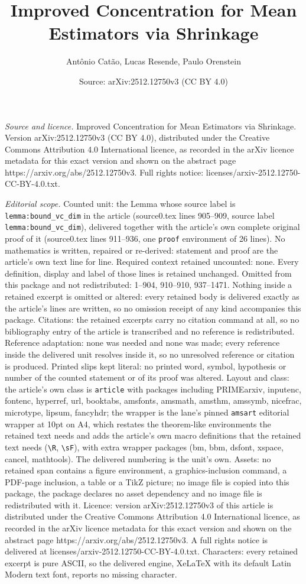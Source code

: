 \documentclass[10pt,a4paper]{amsart}
\title[Improved Concentration for Mean Estimators via Shrinkage]{Improved Concentration for Mean Estimators via Shrinkage}
\author{Ant\^onio Cat\~ao, Lucas Resende, Paulo Orenstein}
\date{Source: arXiv:2512.12750v3 (CC BY 4.0)}
\begin{document}
\maketitle

\noindent\emph{Source and licence.} Improved Concentration for Mean Estimators via Shrinkage. Version arXiv:2512.12750v3 (CC BY 4.0), distributed under the Creative Commons Attribution 4.0 International licence, as recorded in the arXiv licence metadata for this exact version and shown on the abstract page https://arxiv.org/abs/2512.12750v3. Full rights notice: licenses/arxiv-2512.12750-CC-BY-4.0.txt.\par\smallskip

\noindent\textit{Editorial scope.} Counted unit: the Lemma whose source label is \texttt{lemma:bound\_vc\_dim} in the article (source0.tex lines 905--909, source label \texttt{lemma:bound\_vc\_dim}), delivered together with the article's own complete original proof of it (source0.tex lines 911--936, one \texttt{proof} environment of 26 lines). No mathematics is written, repaired or re-derived: statement and proof are the article's own text line for line. Required context retained uncounted: none. Every definition, display and label of those lines is retained unchanged. Omitted from this package and not redistributed: 1--904, 910--910, 937--1471. Nothing inside a retained excerpt is omitted or altered: every retained body is delivered exactly as the article's lines are written, so no omission receipt of any kind accompanies this package. Citations: the retained excerpts carry no citation command at all, so no bibliography entry of the article is transcribed and no reference is redistributed. Reference adaptation: none was needed and none was made; every reference inside the delivered unit resolves inside it, so no unresolved reference or citation is produced. Printed slips kept literal: no printed word, symbol, hypothesis or number of the counted statement or of its proof was altered. Layout and class: the article's own class is \texttt{article} with packages including PRIMEarxiv, inputenc, fontenc, hyperref, url, booktabs, amsfonts, amsmath, amsthm, amssymb, nicefrac, microtype, lipsum, fancyhdr; the wrapper is the lane's pinned \texttt{amsart} editorial wrapper at 10pt on A4, which restates the theorem-like environments the retained text needs and adds the article's own macro definitions that the retained text needs (\texttt{\textbackslash R}, \texttt{\textbackslash sF}), with extra wrapper packages (bm, bbm, dsfont, xspace, cancel, mathtools). The delivered numbering is the unit's own. Assets: no retained span contains a figure environment, a graphics-inclusion command, a PDF-page inclusion, a table or a TikZ picture; no image file is copied into this package, the package declares no asset dependency and no image file is redistributed with it. Licence: version arXiv:2512.12750v3 of this article is distributed under the Creative Commons Attribution 4.0 International licence, as recorded in the arXiv licence metadata for this exact version and shown on the abstract page https://arxiv.org/abs/2512.12750v3. A full rights notice is delivered at licenses/arxiv-2512.12750-CC-BY-4.0.txt. Characters: every retained excerpt is pure ASCII, so the delivered engine, XeLaTeX with its default Latin Modern text font, reports no missing character.
\end{document}
